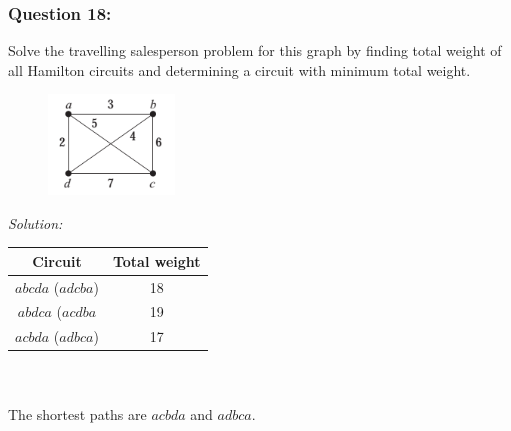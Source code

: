 \documentclass[a4paper]{article}
\begin{document}
	\subsubsection*{Question 18:}
	Solve the travelling salesperson problem for this graph by finding total weight of all Hamilton circuits and determining a circuit with minimum total weight.
	\begin{figure}[H]
		\centering
		\includegraphics[width=0.3\textwidth]{tut918.png}
	\end{figure} 
	\emph{Solution:} \\
	
	\begin{tabular}{|c|c|}
	    \hline
	     Circuit & Total weight  \\
	     \hline
	     $abcda$ ($adcba$) & 18 \\
	     \hline
	     $abdca$ ($acdba$ & 19 \\
	     \hline
	     $acbda$ ($adbca$) & 17 \\
	     \hline
	\end{tabular}
	\\ \\
	The shortest paths are $acbda$ and $adbca$.
	
\end{document}
